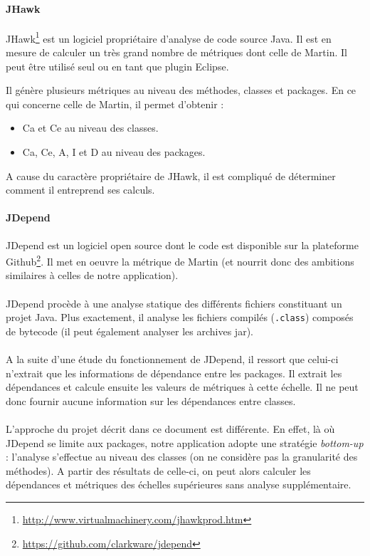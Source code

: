 \documentclass{scrartcl}
\begin{document}
    \paragraph{JHawk}JHawk\footnote{\url{http://www.virtualmachinery.com/jhawkprod.htm}} est un logiciel propriétaire d'analyse de code source Java. Il est en mesure de calculer un très grand nombre de métriques dont celle de Martin. Il peut être utilisé seul ou en tant que plugin Eclipse.
    
    Il génère plusieurs métriques au niveau des méthodes, classes et packages. En ce qui concerne celle de Martin, il permet d'obtenir :
    \begin{itemize}
        \item Ca et Ce au niveau des classes.
        \item Ca, Ce, A, I et D au niveau des packages.
    \end{itemize}
    A cause du caractère propriétaire de JHawk, il est compliqué de déterminer comment il entreprend ses calculs.
    
    \paragraph{JDepend}JDepend est un logiciel open source dont le code est disponible sur la plateforme Github\footnote{\url{https://github.com/clarkware/jdepend}}. Il met en oeuvre la métrique de Martin (et nourrit donc des ambitions similaires à celles de notre application).

    \paragraph{}JDepend procède à une analyse statique des différents fichiers constituant un projet Java. Plus exactement, il analyse les fichiers compilés (\texttt{.class}) composés de bytecode (il peut également analyser les archives jar).
    
    \paragraph{}A la suite d'une étude du fonctionnement de JDepend, il ressort que celui-ci n'extrait que les informations de dépendance entre les packages. Il extrait les dépendances et calcule ensuite les valeurs de métriques à cette échelle. Il ne peut donc fournir aucune information sur les dépendances entre classes. 
    
    \paragraph{}L'approche du projet décrit dans ce document est différente. En effet, là où JDepend se limite aux packages, notre application adopte une stratégie \textit{bottom-up} : l'analyse s'effectue au niveau des classes (on ne considère pas la granularité des méthodes).
    A partir des résultats de celle-ci, on peut alors calculer les dépendances et métriques des échelles supérieures sans analyse supplémentaire.
    
\end{document}
